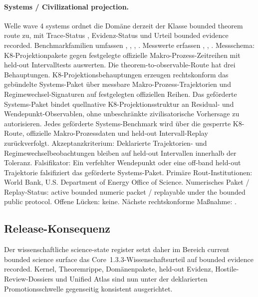 \paragraph{Systems / Civilizational projection.}
Welle wave 4 systems ordnet die Domäne derzeit der Klasse bounded theorem route zu, mit Trace-Status , Evidenz-Status  und Urteil bounded evidence recorded.
Benchmarkfamilien umfassen , \allowbreak {}, \allowbreak {}, \allowbreak {}.
Messwerte erfassen , \allowbreak {}, \allowbreak {}.
Messschema: K8-Projektionpakete gegen festgelegte offizielle Makro-Prozess-Zeitreihen mit held-out Intervalltests auswerten.
Die theorem-to-observable-Route hat drei Behauptungen. K8-Projektionsbehauptungen erzeugen rechtskonform das gebündelte Systems-Paket über messbare Makro-Prozess-Trajektorien und Regimewechsel-Signaturen auf festgelegten offiziellen Reihen. Das geförderte Systems-Paket bindet quellnative K8-Projektionsstruktur an Residual- und Wendepunkt-Observablen, ohne unbeschränkte zivilisatorische Vorhersage zu autorisieren. Jedes geförderte Systems-Benchmark wird über die gesperrte K8-Route, offizielle Makro-Prozessdaten und held-out Intervall-Replay zurückverfolgt.
Akzeptanzkriterium: Deklarierte Trajektorien- und Regimewechselbeobachtungen bleiben auf held-out Intervallen innerhalb der Toleranz.
Falsifikator: Ein verfehlter Wendepunkt oder eine off-band held-out Trajektorie falsifiziert das geförderte Systems-Paket.
Primäre Rout-Institutionen: World Bank, \allowbreak U.S. Department of Energy Office of Science.
Numerisches Paket / Replay-Status: active bounded numeric packet / replayable under the bounded public protocol.
Offene Lücken: keine.
Nächste rechtskonforme Maßnahme: .

\subsection{Release-Konsequenz}
Der wissenschaftliche science-state register setzt daher im Bereich current bounded science surface das Core~1.3.3-Wissenschaftsurteil auf bounded evidence recorded.
Kernel, Theoremrippe, Domänenpakete, held-out Evidenz, Hostile-Review-Dossiers und Unified Atlas sind nun unter der deklarierten Promotionsschwelle gegenseitig konsistent ausgerichtet.
